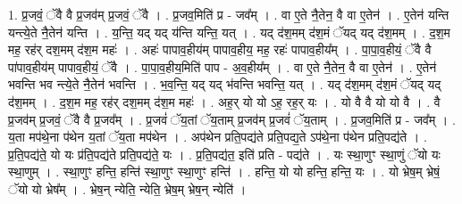 \documentclass[17pt]{extarticle}
\begin{document}
1. प्र॒जवं॒ ॅवै वै प्र॒जव॑म् प्र॒जवं॒ ॅवै । . प्र॒जव॒मिति॑ प्र - जव᳚म् । . वा ए॒ते नै॒तेन॒ वै वा ए॒तेन॑ । . ए॒तेन॑ यन्ति यन्त्ये॒ते नै॒तेन॑ यन्ति । . य॒न्ति॒ यद् यद् य॑न्ति यन्ति॒ यत् । . यद् द॑श॒मम् द॑श॒मं ॅयद् यद् द॑श॒मम् । . द॒श॒म मह॒ रह॑र् दश॒मम् द॑श॒म महः॑ । . अहः॑ पापाव॒हीय॑म् पापाव॒हीय॒ मह॒ रहः॑ पापाव॒हीय᳚म् । . पा॒पा॒व॒हीयं॒ ॅवै वै पा॑पाव॒हीय॑म् पापाव॒हीयं॒ ॅवै । . पा॒पा॒व॒हीय॒मिति॑ पाप - अ॒व॒हीय᳚म् । . वा ए॒ते नै॒तेन॒ वै वा ए॒तेन॑ । . ए॒तेन॑ भवन्ति भव न्त्ये॒ते नै॒तेन॑ भवन्ति । . भ॒व॒न्ति॒ यद् यद् भ॑वन्ति भवन्ति॒ यत् । . यद् द॑श॒मम् द॑श॒मं ॅयद् यद् द॑श॒मम् । . द॒श॒म मह॒ रह॑र् दश॒मम् द॑श॒म महः॑ । . अह॒र् यो यो ऽह॒ रह॒र् यः । . यो वै वै यो यो वै । . वै प्र॒जव॑म् प्र॒जवं॒ ॅवै वै प्र॒जव᳚म् । . प्र॒जवं॑ ॅय॒तां ॅय॒ताम् प्र॒जव॑म् प्र॒जवं॑ ॅय॒ताम् । . प्र॒जव॒मिति॑ प्र - जव᳚म् । . य॒ता मप॑थे॒ना प॑थेन य॒तां ॅय॒ता मप॑थेन । . अप॑थेन प्रति॒पद्य॑ते प्रति॒पद्य॒ते ऽप॑थे॒ना प॑थेन प्रति॒पद्य॑ते । . प्र॒ति॒पद्य॑ते॒ यो यः प्र॑ति॒पद्य॑ते प्रति॒पद्य॑ते॒ यः । . प्र॒ति॒पद्य॑त॒ इति॑ प्रति - पद्य॑ते । . यः स्था॒णुꣳ स्था॒णुं ॅयो यः स्था॒णुम् । . स्था॒णुꣳ हन्ति॒ हन्ति॑ स्था॒णुꣳ स्था॒णुꣳ हन्ति॑ । . हन्ति॒ यो यो हन्ति॒ हन्ति॒ यः । . यो भ्रेष॒म् भ्रेषं॒ ॅयो यो भ्रेष᳚म् । . भ्रेष॒न् न्येति॒ न्येति॒ भ्रेष॒म् भ्रेष॒न् न्येति॑ । \newline
\end{document}
